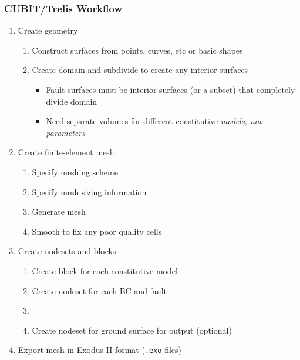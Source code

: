 \documentclass[aspectratio=169]{beamer}
\begin{document}
\begin{frame}
  \frametitle{CUBIT/Trelis Workflow}
  \summary{}
 
  \begin{enumerate}
  \item Create geometry
    \begin{enumerate}
    \item Construct surfaces from points, curves, etc or basic shapes
    \item Create domain and subdivide to create any interior surfaces
      \begin{itemize}
      \item Fault surfaces must be interior surfaces (or a subset) that completely divide domain
      \item Need separate volumes for different constitutive {\em models, not parameters}
      \end{itemize}
    \end{enumerate}
  \item Create finite-element mesh
    \begin{enumerate}
    \item Specify meshing scheme
    \item Specify mesh sizing information
    \item Generate mesh
    \item Smooth to fix any poor quality cells
    \end{enumerate}
  \item Create nodesets and blocks
    \begin{enumerate}
    \item Create block for each constitutive model
    \item Create nodeset for each BC and fault
    \item {}
    \item Create nodeset for ground surface for output (optional)
    \end{enumerate}
  \item Export mesh in Exodus II format ({\tt .exo} files)
  \end{enumerate}

\end{frame}
\end{document}
